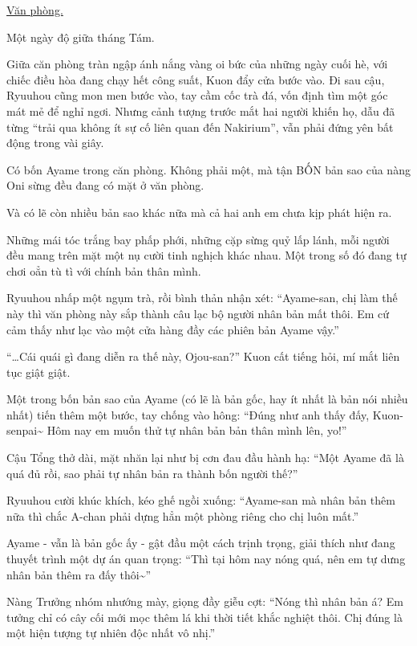 \documentclass[../main.tex]{subfiles}
\begin{document}
\begin{center}
  \uline{Văn phòng.}
\end{center}

Một ngày độ giữa tháng Tám.

Giữa căn phòng tràn ngập ánh nắng vàng oi bức của những ngày cuối hè, với chiếc điều hòa đang chạy hết công suất, Kuon đẩy cửa bước vào. Đi sau cậu, Ryuuhou cũng mon men bước vào, tay cầm cốc trà đá, vốn định tìm một góc mát mẻ để nghỉ ngơi. Nhưng cảnh tượng trước mắt hai người khiến họ, dẫu đã từng ``trải qua không ít sự cố liên quan đến Nakirium'', vẫn phải đứng yên bất động trong vài giây.

Có bốn Ayame trong căn phòng. Không phải một, mà tận BỐN bản sao của nàng Oni sừng đều đang có mặt ở văn phòng.


Và có lẽ còn nhiều bản sao khác nữa mà cả hai anh em chưa kịp phát hiện ra.

Những mái tóc trắng bay phấp phới, những cặp sừng quỷ lấp lánh, mỗi người đều mang trên mặt một nụ cười tinh nghịch khác nhau. Một trong số đó đang tự chơi oẳn tù tì với chính bản thân mình.

Ryuuhou nhấp một ngụm trà, rồi bình thản nhận xét: ``Ayame-san, chị làm thế này thì văn phòng này sắp thành câu lạc bộ người nhân bản mất thôi. Em cứ cảm thấy như lạc vào một cửa hàng đầy các phiên bản Ayame vậy.''

``\dots Cái quái gì đang diễn ra thế này, Ojou-san?'' Kuon cất tiếng hỏi, mí mắt liên tục giật giật.

Một trong bốn bản sao của Ayame (có lẽ là bản gốc, hay ít nhất là bản nói nhiều nhất) tiến thêm một bước, tay chống vào hông: ``Đúng như anh thấy đấy, Kuon-senpai\~{} Hôm nay em muốn thử tự nhân bản bản thân mình lên, yo!''

Cậu Tổng thở dài, mặt nhăn lại như bị cơn đau đầu hành hạ: ``Một Ayame đã là quá đủ rồi, sao phải tự nhân bản ra thành bốn người thế?''

Ryuuhou cười khúc khích, kéo ghế ngồi xuống: ``Ayame-san mà nhân bản thêm nữa thì chắc A-chan phải dựng hẳn một phòng riêng cho chị luôn mất.''

Ayame - vẫn là bản gốc ấy - gật đầu một cách trịnh trọng, giải thích như đang thuyết trình một dự án quan trọng: ``Thì tại hôm nay nóng quá, nên em tự dưng nhân bản thêm ra đấy thôi\~{}''

Nàng Trưởng nhóm nhướng mày, giọng đầy giễu cợt: ``Nóng thì nhân bản á? Em tưởng chỉ có cây cối mới mọc thêm lá khi thời tiết khắc nghiệt thôi. Chị đúng là một hiện tượng tự nhiên độc nhất vô nhị.''
\end{document}
